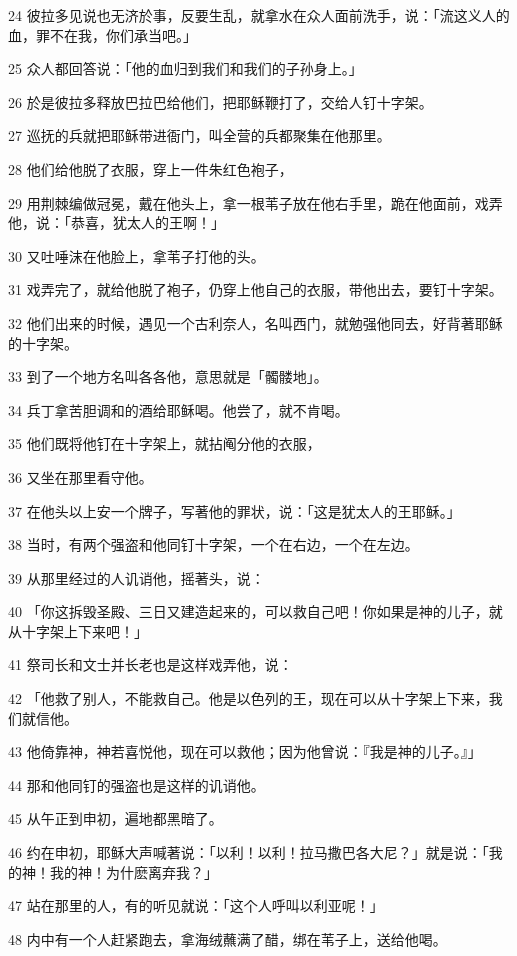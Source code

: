 \par 24 彼拉多见说也无济於事，反要生乱，就拿水在众人面前洗手，说：「流这义人的血，罪不在我，你们承当吧。」
\par 25 众人都回答说：「他的血归到我们和我们的子孙身上。」
\par 26 於是彼拉多释放巴拉巴给他们，把耶稣鞭打了，交给人钉十字架。
\par 27 巡抚的兵就把耶稣带进衙门，叫全营的兵都聚集在他那里。
\par 28 他们给他脱了衣服，穿上一件朱红色袍子，
\par 29 用荆棘编做冠冕，戴在他头上，拿一根苇子放在他右手里，跪在他面前，戏弄他，说：「恭喜，犹太人的王啊！」
\par 30 又吐唾沫在他脸上，拿苇子打他的头。
\par 31 戏弄完了，就给他脱了袍子，仍穿上他自己的衣服，带他出去，要钉十字架。
\par 32 他们出来的时候，遇见一个古利奈人，名叫西门，就勉强他同去，好背著耶稣的十字架。
\par 33 到了一个地方名叫各各他，意思就是「髑髅地」。
\par 34 兵丁拿苦胆调和的酒给耶稣喝。他尝了，就不肯喝。
\par 35 他们既将他钉在十字架上，就拈阄分他的衣服，
\par 36 又坐在那里看守他。
\par 37 在他头以上安一个牌子，写著他的罪状，说：「这是犹太人的王耶稣。」
\par 38 当时，有两个强盗和他同钉十字架，一个在右边，一个在左边。
\par 39 从那里经过的人讥诮他，摇著头，说：
\par 40 「你这拆毁圣殿、三日又建造起来的，可以救自己吧！你如果是神的儿子，就从十字架上下来吧！」
\par 41 祭司长和文士并长老也是这样戏弄他，说：
\par 42 「他救了别人，不能救自己。他是以色列的王，现在可以从十字架上下来，我们就信他。
\par 43 他倚靠神，神若喜悦他，现在可以救他；因为他曾说：『我是神的儿子。』」
\par 44 那和他同钉的强盗也是这样的讥诮他。
\par 45 从午正到申初，遍地都黑暗了。
\par 46 约在申初，耶稣大声喊著说：「以利！以利！拉马撒巴各大尼？」就是说：「我的神！我的神！为什麽离弃我？」
\par 47 站在那里的人，有的听见就说：「这个人呼叫以利亚呢！」
\par 48 内中有一个人赶紧跑去，拿海绒蘸满了醋，绑在苇子上，送给他喝。
